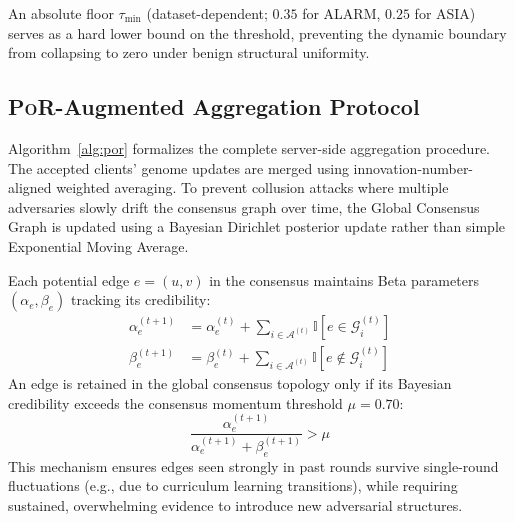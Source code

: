 \documentclass[journal]{IEEEtran}
\newcommand{\por}{\textsc{PoR}}
\newcommand{\calA}{\mathcal{A}}
\newcommand{\calG}{\mathcal{G}}
\begin{document}
An absolute floor $\tau_{\min}$ (dataset-dependent; $0.35$ for ALARM,
$0.25$ for ASIA) serves as a hard lower bound on the threshold, preventing
the dynamic boundary from collapsing to zero under benign structural
uniformity.

\subsection{\por{}-Augmented Aggregation Protocol}
\label{sec:protocol}

Algorithm~\ref{alg:por} formalizes the complete server-side aggregation
procedure. The accepted clients' genome updates are merged using
innovation-number-aligned weighted averaging. To prevent collusion
attacks where multiple adversaries slowly drift the consensus graph over
time, the Global Consensus Graph is updated using a Bayesian Dirichlet
posterior update rather than simple Exponential Moving Average.

Each potential edge $e = (u,v)$ in the consensus maintains Beta
parameters $(\alpha_e, \beta_e)$ tracking its credibility:
\begin{align}
  \alpha_e^{(t+1)} &= \alpha_e^{(t)} + \sum_{i \in \calA^{(t)}} \mathbb{I}[e \in \calG_i^{(t)}] \\
  \beta_e^{(t+1)}  &= \beta_e^{(t)} + \sum_{i \in \calA^{(t)}} \mathbb{I}[e \notin \calG_i^{(t)}]
\end{align}
An edge is retained in the global consensus topology only if its Bayesian
credibility exceeds the consensus momentum threshold $\mu = 0.70$:
\begin{equation}
  \frac{\alpha_e^{(t+1)}}{\alpha_e^{(t+1)} + \beta_e^{(t+1)}} > \mu
\end{equation}
This mechanism ensures edges seen strongly in past rounds survive single-round
fluctuations (e.g., due to curriculum learning transitions), while requiring
sustained, overwhelming evidence to introduce new adversarial structures.
\end{document}
